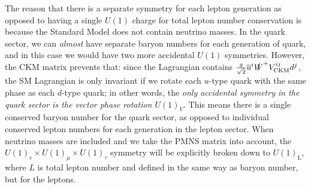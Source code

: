 \documentclass[11pt, oneside]{article}   	%
\theoremstyle{definition}
\numberwithin{equation}{subsection}		%
\begin{document}
The reason that there is a separate symmetry for each lepton generation as opposed to having a single $U(1)$ charge for total lepton 
number conservation is because the Standard Model does not contain neutrino masses. In the quark sector, we can \textit{almost} have 
separate baryon numbers for each generation of quark, and in this case we would have two more accidental $U(1)$ symmetries. However, 
the CKM matrix prevents that: since the Lagrangian contains $\frac{g}{\sqrt 2} \overline u^i \slashed W^+ V_\mathrm{CKM}^{ij} d^j$, the SM 
Lagrangian is only invariant if we rotate each $u$-type quark with the same phase as each $d$-type quark; in other words, the \textit{only 
accidental symmetry in the quark sector is the vector phase rotation $U(1)_V$}. This means there is a single conserved baryon number for 
the quark sector, as opposed to individual conserved lepton numbers for each generation in the lepton sector. When neutrino masses are 
included and we take the PMNS matrix into account, the $U(1)_e\times U(1)_\mu\times U(1)_\tau$ symmetry will be explicitly broken 
down to $U(1)_\mathrm{L}$, where $L$ is total lepton number and defined in the same way as baryon number, but for the leptons. 
\end{document}
